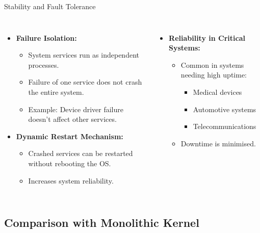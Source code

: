 \documentclass[aspectratio=169, table]{beamer}
\begin{document}
\begin{frame}{Stability and Fault Tolerance}
\begin{columns}
\begin{itemize}
	\item \textbf{Failure Isolation:}
	\begin{itemize}
		\item System services run as independent processes.
		\item Failure of one service does not crash the entire system.
		\item Example: Device driver failure doesn't affect other services.
	\end{itemize}
	
	\item \textbf{Dynamic Restart Mechanism:}
	\begin{itemize}
		\item Crashed services can be restarted without rebooting the OS.
		\item Increases system reliability.
	\end{itemize}
\end{itemize}
\begin{itemize}
	\item \textbf{Reliability in Critical Systems:}
	\begin{itemize}
		\item Common in systems needing high uptime:
		\begin{itemize}
			\item Medical devices
			\item Automotive systems
			\item Telecommunications
		\end{itemize}
		\item Downtime is minimised.
	\end{itemize}
\end{itemize}
\end{columns}
\end{frame}

\subsection{Comparison with Monolithic Kernel}

\end{document}
